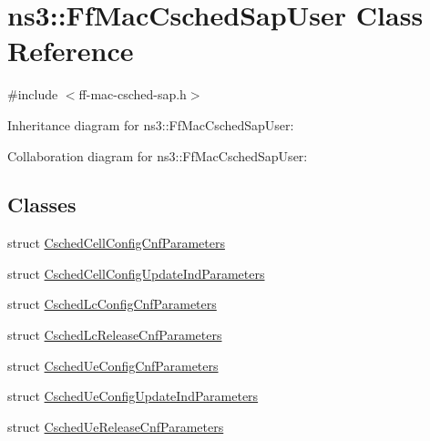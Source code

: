 \hypertarget{classns3_1_1FfMacCschedSapUser}{}\section{ns3\+:\+:Ff\+Mac\+Csched\+Sap\+User Class Reference}
\label{classns3_1_1FfMacCschedSapUser}


{\ttfamily \#include $<$ff-\/mac-\/csched-\/sap.\+h$>$}



Inheritance diagram for ns3\+:\+:Ff\+Mac\+Csched\+Sap\+User\+:


Collaboration diagram for ns3\+:\+:Ff\+Mac\+Csched\+Sap\+User\+:
\subsection*{Classes}
\begin{DoxyCompactItemize}
\item 
struct \hyperlink{structns3_1_1FfMacCschedSapUser_1_1CschedCellConfigCnfParameters}{Csched\+Cell\+Config\+Cnf\+Parameters}
\item 
struct \hyperlink{structns3_1_1FfMacCschedSapUser_1_1CschedCellConfigUpdateIndParameters}{Csched\+Cell\+Config\+Update\+Ind\+Parameters}
\item 
struct \hyperlink{structns3_1_1FfMacCschedSapUser_1_1CschedLcConfigCnfParameters}{Csched\+Lc\+Config\+Cnf\+Parameters}
\item 
struct \hyperlink{structns3_1_1FfMacCschedSapUser_1_1CschedLcReleaseCnfParameters}{Csched\+Lc\+Release\+Cnf\+Parameters}
\item 
struct \hyperlink{structns3_1_1FfMacCschedSapUser_1_1CschedUeConfigCnfParameters}{Csched\+Ue\+Config\+Cnf\+Parameters}
\item 
struct \hyperlink{structns3_1_1FfMacCschedSapUser_1_1CschedUeConfigUpdateIndParameters}{Csched\+Ue\+Config\+Update\+Ind\+Parameters}
\item 
struct \hyperlink{structns3_1_1FfMacCschedSapUser_1_1CschedUeReleaseCnfParameters}{Csched\+Ue\+Release\+Cnf\+Parameters}
\end{DoxyCompactItemize}

